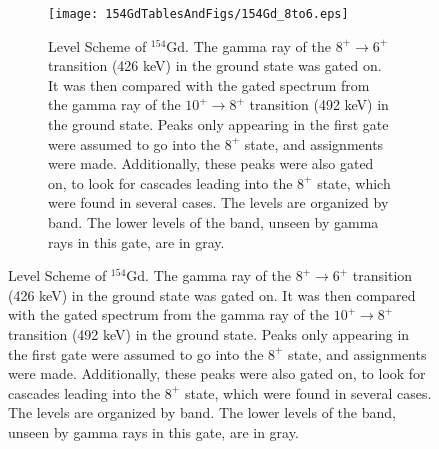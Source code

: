 \begin{figure}[!]
    \centering
    \begin{subfigure}{\textwidth}
    \texttt{[image: 154GdTablesAndFigs/154Gd\_8to6.eps]}
    \caption{\label{fig:154_8to6level}Level Scheme of $^{154}$Gd. The gamma ray of the $8^+\rightarrow6^+$ transition (426 keV) in the ground state was gated on. It was then compared with the gated spectrum from the gamma ray of the $10^+\rightarrow8^+$ transition (492 keV) in the ground state. Peaks only appearing in the first gate were assumed to go into the $8^+$ state, and assignments were made. Additionally, these peaks were also gated on, to look for cascades leading into the $8^+$ state, which were found in several cases. The levels are organized by band. The lower levels of the band, unseen by gamma rays in this gate, are in gray.}
    \end{subfigure}
    \label{fig:154_8to6}
    \end{figure}
